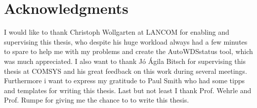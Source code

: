 \cleardoublepage

\chapter*{Acknowledgments}

I would like to thank Christoph Wollgarten at LANCOM for enabling and supervising this thesis, who despite his huge workload always had a few minutes to spare
to help me with my problems and create the AutoWDSstatus tool, which was much appreciated.
I also want to thank J\'o \'Agila Bitsch for supervising this thesis at COMSYS and his great feedback on this work during several meetings.
Furthermore i want to express my gratitude to Paul Smith who had some tipps and templates for writing this thesis.
Last but not least I thank Prof. Wehrle and Prof. Rumpe for giving me the chance to to write this thesis.
